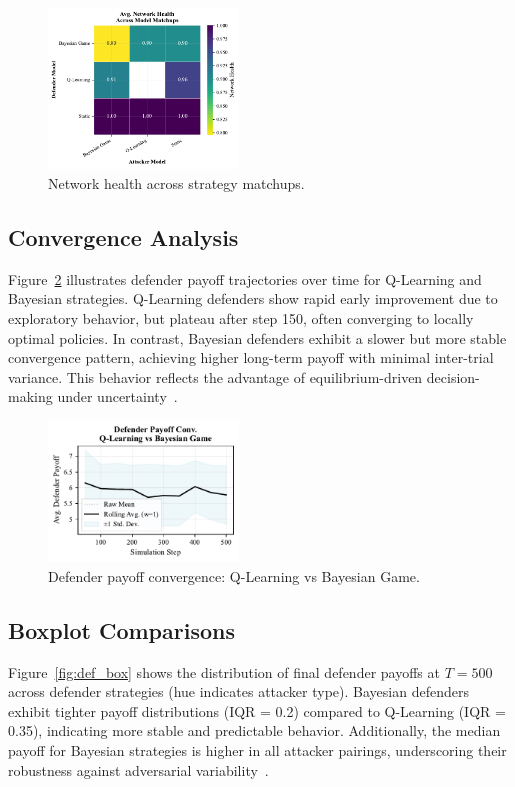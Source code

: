 \documentclass[conference]{IEEEtran}
\begin{document}
\begin{figure}[htbp]
  \centering
  \includegraphics[width=0.45\textwidth]{fig_net_health_heatmap.pdf}
  \caption{Network health across strategy matchups.}
  \label{fig:health_heatmap}
\end{figure}

\subsection{Convergence Analysis}
Figure~\ref{fig:conv_db} illustrates defender payoff trajectories over time for Q-Learning and Bayesian strategies. Q-Learning defenders show rapid early improvement due to exploratory behavior, but plateau after step 150, often converging to locally optimal policies. In contrast, Bayesian defenders exhibit a slower but more stable convergence pattern, achieving higher long-term payoff with minimal inter-trial variance. This behavior reflects the advantage of equilibrium-driven decision-making under uncertainty~\cite{zeng2023comparison}.

\begin{figure}[htbp]
  \centering
  \includegraphics[width=0.45\textwidth]{fig_def_convergence.pdf}
  \caption{Defender payoff convergence: Q-Learning vs Bayesian Game.}
  \label{fig:conv_db}
\end{figure}

\subsection{Boxplot Comparisons}
Figure~\ref{fig:def_box} shows the distribution of final defender payoffs at $T=500$ across defender strategies (hue indicates attacker type). Bayesian defenders exhibit tighter payoff distributions (IQR = 0.2) compared to Q-Learning (IQR = 0.35), indicating more stable and predictable behavior. Additionally, the median payoff for Bayesian strategies is higher in all attacker pairings, underscoring their robustness against adversarial variability~\cite{zeng2023comparison}.
\end{document}
